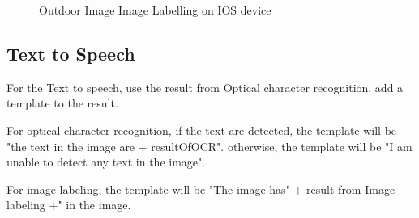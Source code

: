 \documentclass[11pt]{ucscthesis}
\begin{document}
\begin{figure}
  \hfill
\caption{Outdoor Image Image Labelling on IOS device}
\end{figure}


\subsection{Text to Speech}
For the Text to speech, use the result from Optical character recognition, add a template to the result.

For optical character recognition, if the text are detected, the template will be "the text in the image are + resultOfOCR". otherwise, the template will be "I am unable to detect any text in the image".

For image labeling, the template will be "The image has" + result from Image labeling +" in the image.
\end{document}
